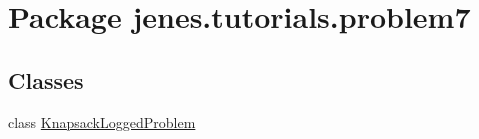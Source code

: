 \hypertarget{namespacejenes_1_1tutorials_1_1problem7}{\section{Package jenes.\-tutorials.\-problem7}
\label{namespacejenes_1_1tutorials_1_1problem7}
}
\subsection*{Classes}
\begin{DoxyCompactItemize}
\item 
class \hyperlink{classjenes_1_1tutorials_1_1problem7_1_1_knapsack_logged_problem}{Knapsack\-Logged\-Problem}
\end{DoxyCompactItemize}
